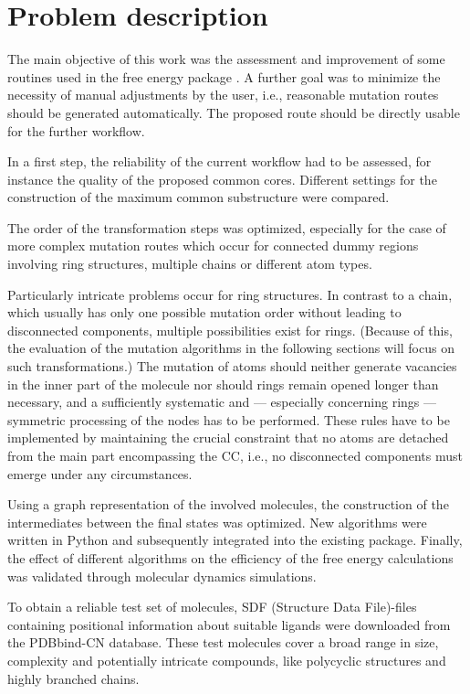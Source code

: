 \chapter{Problem description }

The main objective of this work was the assessment and improvement of some routines
used in the free energy package {\trafo}. A further goal was to
minimize the necessity of manual adjustments by the user, i.e.,
reasonable mutation routes should be generated automatically. The
proposed route should be directly usable for the further {\trafo}
workflow.

In a first step, the reliability of the current {\trafo} workflow
had to be assessed, for instance the quality of the proposed common
cores. Different settings for the construction of the maximum common
substructure were compared. 

The order of the transformation steps was optimized, especially
for the case of more complex mutation routes which occur for connected
dummy regions involving ring structures, multiple chains or different
atom types. 

Particularly intricate problems occur for ring structures. In contrast to a chain, which usually has only one possible mutation order without leading to disconnected components, multiple possibilities  exist for rings. (Because of this, the evaluation of the mutation algorithms in the following sections will focus on such transformations.) The mutation of atoms should neither generate vacancies in the inner part of the
molecule nor should rings remain opened longer than necessary, and
a sufficiently systematic and --- especially concerning rings --- symmetric
processing of the nodes has to be performed. These rules have to be
implemented by maintaining the crucial constraint that no atoms are
detached from the main part encompassing the CC, i.e., no
disconnected components must emerge under any circumstances.

Using a graph representation of the involved molecules, the construction
of the intermediates between the final states was optimized.
New algorithms were written in Python and subsequently integrated
into the existing {\trafo} package. Finally, the effect of different
algorithms on the efficiency of the free energy calculations was validated through molecular dynamics simulations. 

To obtain a reliable test set of molecules, SDF (Structure Data File)-files containing positional information about suitable ligands were downloaded from the PDBbind-CN \cite{Wang.2004} database. These test molecules cover a
broad range in size, complexity and potentially intricate compounds,
like polycyclic structures and highly branched chains.


